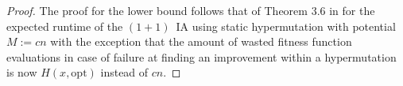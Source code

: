 \documentclass[lettersize,journal]{IEEEtran}
\begin{document}
\begin{proof}

The proof for the lower bound follows that  of Theorem 3.6 in \cite{CorusOlivetoYazdaniGECCO2017} for the expected runtime of the $(1+1)$~IA %
using static hypermutation with potential $M:=cn$ with the exception that the amount of wasted fitness function evaluations in case of failure at finding an improvement within a hypermutation is now $H(x,\text{opt})$ instead of $cn$.



\end{proof}
\end{document}

